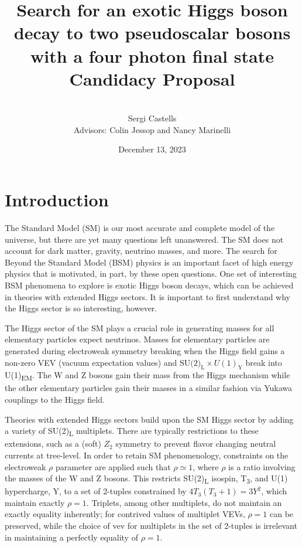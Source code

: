 \documentclass[12pt]{article}
\title{
    Search for an exotic Higgs boson decay to two pseudoscalar bosons with a four photon final state\\[0.2cm]
    \Large Candidacy Proposal
}
\author{\\[0.25cm]Sergi Castells\\[0.25cm] Advisors: Colin Jessop and Nancy Marinelli\\[0.75cm]}
\date{December 13, 2023}
\begin{document}
\maketitle

\section{Introduction}
The Standard Model (SM) is our most accurate and complete model of the universe, but there are yet many questions left unanswered. The SM does not account for dark matter, gravity, neutrino masses, and more. The search for Beyond the Standard Model (BSM) physics is an important facet of high energy physics that is motivated, in part, by these open questions. One set of interesting BSM phenomena to explore is exotic Higgs boson decays, which can be achieved in theories with extended Higgs sectors. It is important to first understand why the Higgs sector is so interesting, however.\par

The Higgs sector of the SM plays a crucial role in generating masses for all elementary particles expect neutrinos. Masses for elementary particles are generated during electroweak symmetry breaking when the Higgs field gains a non-zero VEV (vacuum expectation values) and $\text{SU(2)}_\text{L} \times U(1)_\text{Y}$ break into U(1)\textsubscript{EM}. The W and Z bosons gain their mass from the Higgs mechanism while the other elementary particles gain their masses in a similar fashion via Yukawa couplings to the Higgs field.\par

Theories with extended Higgs sectors build upon the SM Higgs sector by adding a variety of SU(2)\textsubscript{L} multiplets. There are typically restrictions to these extensions, such as a (soft) $Z_2$ symmetry to prevent flavor changing neutral currents at tree-level. In order to retain SM phenomenology, constraints on the electroweak $\rho$ parameter are applied such that $\rho \simeq 1$, where $\rho$ is a ratio involving the masses of the W and Z bosons. This restricts SU(2)\textsubscript{L} isospin, T\textsubscript{3}, and U(1) hypercharge, Y, to a set of 2-tuples constrained by $4T_3(T_3 + 1) = 3Y^2$, which maintain exactly $\rho = 1$. Triplets, among other multiplets, do not maintain an exactly equality inherently; for contrived values of multiplet VEVs, $\rho = 1$ can be preserved, while the choice of vev for multiplets in the set of 2-tuples is irrelevant in maintaining a perfectly equality of $\rho = 1$.\par
\end{document}
